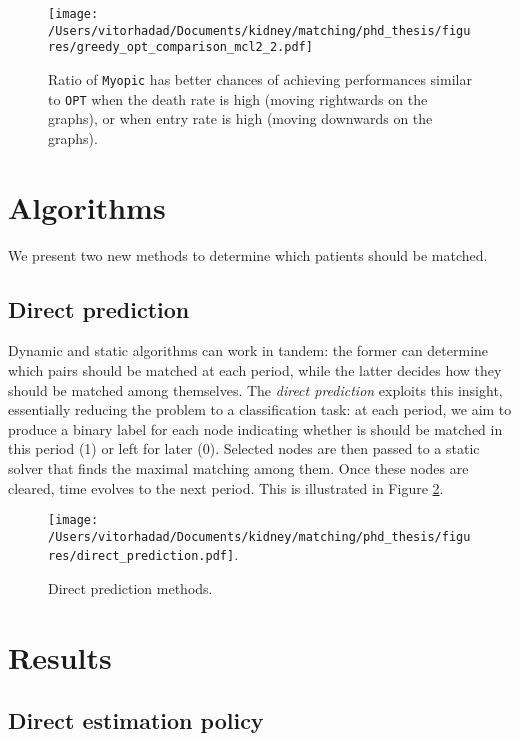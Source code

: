 \documentclass[format=acmsmall, review=false]{acmart}
\begin{document}
\begin{figure}[H]
\centering
\hspace*{-3.5cm}
\texttt{[image: /Users/vitorhadad/Documents/kidney/matching/phd\_thesis/figures/greedy\_opt\_comparison\_mcl2\_2.pdf]}
\caption{Ratio of \texttt{Myopic} has better chances of achieving performances similar to \texttt{OPT} when the death rate is high (moving rightwards on the graphs), or when entry rate is high (moving downwards on the graphs).}
\label{fig:greedy_opt_compariso}
\end{figure}


\section{Algorithms}

We present two new methods to determine which patients should be matched.

\subsection{Direct prediction} \label{subsec:direct_prediction}

Dynamic and static algorithms can work in tandem: the former can determine which pairs should be matched at each period, while the latter decides how they should be matched among themselves. The \emph{direct prediction} exploits this insight, essentially reducing the problem to a classification task: at each period, we aim to produce a binary label for each node indicating whether is should be matched in this period (1) or left for later (0). Selected nodes are then passed to a static solver that finds the maximal matching among them. Once these nodes are cleared, time evolves to the next period. This is illustrated in Figure \ref{fig:direct_prediction}.

\begin{figure}[H]
\centering
\hspace*{-1cm}
\texttt{[image: /Users/vitorhadad/Documents/kidney/matching/phd\_thesis/figures/direct\_prediction.pdf]}.
\caption{Direct prediction methods.}
\label{fig:direct_prediction}
\end{figure}


\section{Results}

\subsection{Direct estimation policy}
\end{document}
